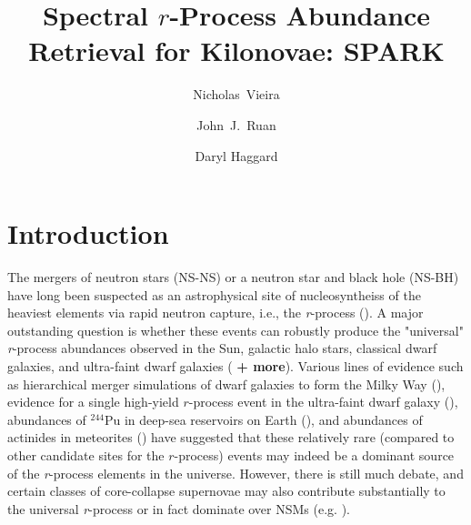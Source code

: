 \documentclass[twocolumn]{aastex63}
\begin{document}
\title{Spectral $r$-Process Abundance Retrieval for Kilonovae: \textsc{SPARK}}


\author[0000-0001-7815-7604]{Nicholas~Vieira}

\author[0000-0001-8665-5523]{John~J.~Ruan}

\author[0000-0001-6803-2138]{Daryl Haggard}


\begin{abstract}
\end{abstract}


\section{Introduction}\label{sec:intro}
The mergers of neutron stars (NS-NS) or a neutron star and black hole (NS-BH) have long been suspected as an astrophysical site of nucleosyntheiss of the heaviest elements via rapid neutron capture, i.e., the \textit{r}-process (\citealt{lattimer74, eichler89, freiburghaus99}). A major outstanding question is whether these events can robustly produce the "universal" \textit{r}-process abundances observed in the Sun, galactic halo stars, classical dwarf galaxies, and ultra-faint dwarf galaxies (\citealt{sneden08, ji16, cote18} \textbf{+ more}). Various lines of evidence such as hierarchical merger simulations of dwarf galaxies to form the Milky Way (\citealt{ishimaru15}), evidence for a single high-yield $r$-process event in the ultra-faint dwarf galaxy  (\citealt{ji16, roederer16}), abundances of $^{244}$Pu in deep-sea reservoirs on Earth (\citealt{wallner15}), and abundances of actinides in meteorites (\citealt{bartos19}) have suggested that these relatively rare (compared to other candidate sites for the $r$-process) events may indeed be a dominant source of the \textit{r}-process elements in the universe. However, there is still much debate, and certain classes of core-collapse supernovae may also contribute substantially to the universal \textit{r}-process or in fact dominate over NSMs (e.g. \citealt{siegel19}).
\end{document}
